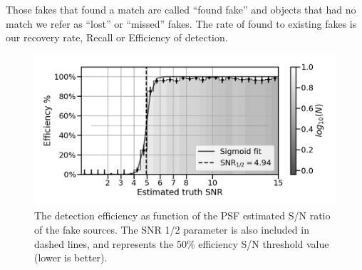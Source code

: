 Those fakes that found a match are called ``found fake'' and objects that had no match we refer as ``lost'' or
``missed'' fakes.  The rate of found to existing fakes is our recovery rate, Recall or Efficiency of detection.

\begin{figure}
    \centering
    \includegraphics[width=0.95\linewidth]{dia/figures/Efficiency_vs_forced_base_PsfFlux_instFlux_SNR.png}
    \caption{The detection efficiency as function of the PSF estimated S/N ratio of the fake sources. The SNR 1/2 parameter is also included in dashed lines, and represents the 50\% efficiency S/N threshold value (lower is better).}
    \label{fig:eff_vs_snr_fakes}
\end{figure}


